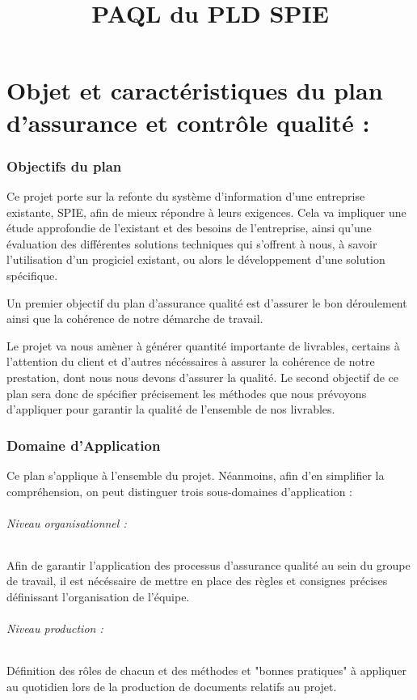 \documentclass[a4paper, 18pt]{article}
\title{PAQL du PLD SPIE}
\begin{document}
\part{Objet et caractéristiques du plan d'assurance et contrôle qualité :}

\section{Objectifs du plan}

Ce projet porte sur la refonte du système d'information d'une entreprise existante, SPIE, afin de mieux répondre à leurs exigences. Cela va impliquer une étude approfondie de l'existant et des besoins de l'entreprise, ainsi qu'une évaluation des différentes solutions techniques qui s'offrent à nous, à savoir l'utilisation d'un progiciel existant, ou alors le développement d'une solution spécifique.

Un premier objectif du plan d'assurance qualité est d'assurer le bon déroulement ainsi que la cohérence de notre démarche de travail.

Le projet va nous amèner à générer quantité importante de livrables, certains à l'attention du client et d'autres nécéssaires à assurer la cohérence de notre prestation, dont nous nous devons d'assurer la qualité. Le second objectif de ce plan sera donc de spécifier précisement les méthodes que nous prévoyons d'appliquer pour garantir la qualité de l'ensemble de nos livrables.

\section{Domaine d'Application}

Ce plan s'applique à l'ensemble du projet. Néanmoins, afin d'en simplifier la compréhension, on peut distinguer trois sous-domaines d'application :

\paragraph{Niveau organisationnel :} Afin de garantir l'application des processus d'assurance qualité au sein du groupe de travail, il est nécéssaire de mettre en place des règles et consignes précises définissant l'organisation de l'équipe.

\paragraph{Niveau production :} Définition des rôles de chacun et des méthodes et "bonnes pratiques" à appliquer au quotidien lors de la production de documents relatifs au projet.
\end{document}
